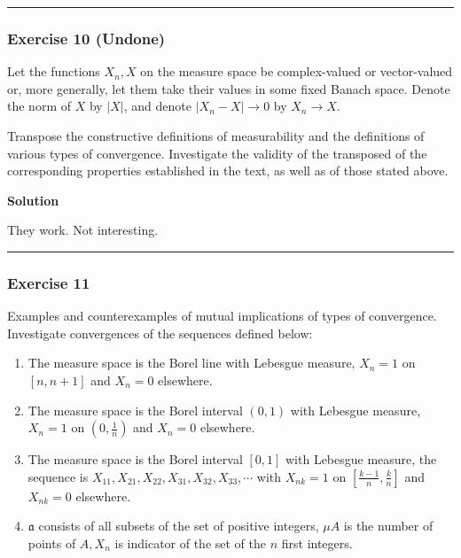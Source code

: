 \documentclass[
]{article}
\begin{document}
\begin{center}\rule{0.5\linewidth}{0.5pt}\end{center}

\hypertarget{exercise-10-undone}{%
  \subsubsection{Exercise 10 (Undone)}\label{exercise-10-undone}}

Let the functions \(X_n, X\) on the measure space be complex-valued or
vector-valued or, more generally, let them take their values in some
fixed Banach space. Denote the norm of \(X\) by \(|X|\), and denote
\(\left|X_n-X\right| \rightarrow 0\) by \(X_n \rightarrow X\).

Transpose the constructive definitions of measurability and the
definitions of various types of convergence. Investigate the validity of
the transposed of the corresponding properties established in the text,
as well as of those stated above.

\textbf{Solution}

They work. Not interesting.

\begin{center}\rule{0.5\linewidth}{0.5pt}\end{center}

\hypertarget{exercise-11}{%
  \subsubsection{Exercise 11}\label{exercise-11}}

Examples and counterexamples of mutual implications of types of
convergence. Investigate convergences of the sequences defined below:

\begin{enumerate}
  \def\labelenumi{\arabic{enumi}.}
  \item
        The measure space is the Borel line with Lebesgue measure, \(X_n=1\)
        on \([n, n+1]\) and \(X_n=0\) elsewhere.
  \item
        The measure space is the Borel interval \((0,1)\) with Lebesgue
        measure, \(X_n=1\) on \(\left(0, \frac{1}{n}\right)\) and \(X_n=0\)
        elsewhere.
  \item
        The measure space is the Borel interval \([0,1]\) with Lebesgue
        measure, the sequence is
        \(X_{11}, X_{21}, X_{22}, X_{31}, X_{32}, X_{33}, \cdots\) with
        \(X_{n k}=1\) on \(\left[\frac{k-1}{n}, \frac{k}{n}\right]\) and
        \(X_{n k}=0\) elsewhere.
  \item
        \(\mathfrak a\) consists of all subsets of the set of positive
        integers, \(\mu A\) is the number of points of \(A, X_n\) is indicator
        of the set of the \(n\) first integers.
\end{enumerate}
\end{document}
